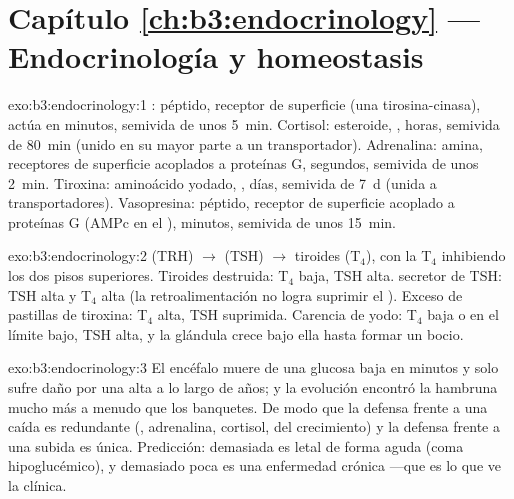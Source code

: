 \section*{Capítulo \ref{ch:b3:endocrinology} --- Endocrinología y homeostasis}

\begin{solution}{exo:b3:endocrinology:1}
: péptido, receptor de superficie (una tirosina-cinasa), actúa
en minutos, semivida de unos \qty{5}{min}. Cortisol: esteroide,
, horas, semivida de \qty{80}{min} (unido en su mayor
parte a un transportador). Adrenalina: amina, receptores de superficie
acoplados a proteínas G, segundos, semivida de unos \qty{2}{min}.
Tiroxina: aminoácido yodado, , días, semivida de
\qty{7}{d} (unida a transportadores). Vasopresina: péptido, receptor de
superficie acoplado a proteínas G (AMPc en el ), minutos,
semivida de unos \qty{15}{min}.
\end{solution}

\begin{solution}{exo:b3:endocrinology:2}
 (TRH) $\to$  (TSH) $\to$ tiroides (T$_{4}$), con la
T$_{4}$ inhibiendo los dos pisos superiores. Tiroides destruida:
T$_{4}$ baja, TSH alta.  secretor de TSH: TSH alta y T$_{4}$ alta
(la retroalimentación no logra suprimir el ). Exceso de pastillas
de tiroxina: T$_{4}$ alta, TSH suprimida. Carencia de yodo: T$_{4}$
baja o en el límite bajo, TSH alta, y la glándula crece bajo ella hasta
formar un bocio.
\end{solution}

\begin{solution}{exo:b3:endocrinology:3}
El encéfalo muere de una glucosa baja en minutos y solo sufre daño por
una alta a lo largo de años; y la evolución encontró la hambruna mucho
más a menudo que los banquetes. De modo que la defensa frente a una
caída es redundante (, adrenalina, cortisol,  del
crecimiento) y la defensa frente a una subida es única. Predicción:
demasiada  es letal de forma aguda (coma hipoglucémico), y
demasiado poca es una enfermedad crónica ---que es lo que ve la
clínica.
\end{solution}

